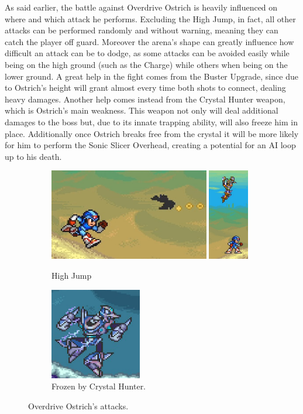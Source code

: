 As said earlier, the battle against Overdrive Ostrich is heavily influenced on where and which attack he performs. Excluding the High Jump, in fact, all other attacks can be performed randomly and without warning, meaning they can catch the player off guard. Moreover the arena's shape can greatly influence how difficult an attack can be to dodge, as some attacks can be avoided easily while being on the high ground (such as the Charge) while others when being on the lower ground. A great help in the fight comes from the Buster Upgrade, since due to Ostrich's height will grant almost every time both shots to connect, dealing heavy damages. Another help comes instead from the Crystal Hunter weapon, which is Ostrich's main weakness. This weapon not only will deal additional damages to the boss but, due to its innate trapping ability, will also freeze him in place. Additionally once Ostrich breaks free from the crystal it will be more likely for him to perform the Sonic Slicer Overhead, creating a potential for an AI loop up to his death.
\begin{figure}[htp]
	\ContinuedFloat
	\centering
	\begin{subfigure}{\linewidth}
		\centering
		\includegraphics[height=4cm]{figures/X2/Overdrive_ostrich/Ostrich_background_2.png}
		\includegraphics[height=4cm]{figures/X2/Overdrive_ostrich/Ostrich_background.png}
		\caption{High Jump}
	\end{subfigure}
	\begin{subfigure}{0.4\linewidth}
		\centering
		\includegraphics[height= 4cm]{figures/X2/Overdrive_ostrich/Ostrich_freeze.png}
		\caption{Frozen by Crystal Hunter.}
	\end{subfigure}
	\caption{Overdrive Ostrich's attacks.}	
\end{figure}
